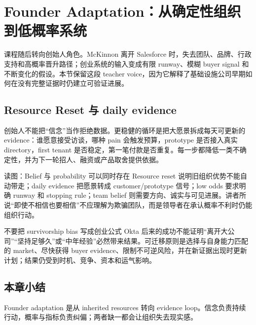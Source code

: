 \section{Founder Adaptation：从确定性组织到低概率系统}

课程随后转向创始人角色。McKinnon 离开 Salesforce 时，失去团队、品牌、行政支持和高概率晋升路径；创业系统的输入变成有限 runway、模糊 buyer signal 和不断变化的假设。本节保留这段 teacher voice，因为它解释了基础设施公司早期如何在没有完整证据时仍建立可验证进展。

\subsection{Resource Reset 与 daily evidence}

创始人不能把“信念”当作拒绝数据。更稳健的循环是把大愿景拆成每天可更新的 evidence：谁愿意接受访谈，哪种 pain 会触发预算，prototype 是否接入真实 directory，first tenant 是否稳定，第一笔付款是否重复。每一步都降低一类不确定性，并为下一轮招人、融资或产品取舍提供依据。


\begin{knowledgebox}{读图：Belief 与 probability 可以同时存在}
Resource reset 说明旧组织优势不能自动带走；daily evidence 把愿景转成 customer/prototype 信号；low odds 要求明确 runway 和 stopping rule；team belief 则需要方向、诚实与可见进展。讲者所说“即使不相信也要相信”不应理解为欺骗团队，而是领导者在承认概率不利时仍能组织行动。
\end{knowledgebox}


\begin{warningbox}{不要把 survivorship bias 写成创业公式}
Okta 后来的成功不能证明“离开大公司”“坚持足够久”或“中年经验”必然带来结果。可迁移原则是选择与自身能力匹配的 market、尽快获得 buyer evidence、限制不可逆风险，并在新证据出现时更新计划；结果仍受到时机、竞争、资本和运气影响。
\end{warningbox}

\subsection{本章小结}

Founder adaptation 是从 inherited resources 转向 evidence loop。信念负责持续行动，概率与指标负责纠偏；两者缺一都会让组织失去现实感。

